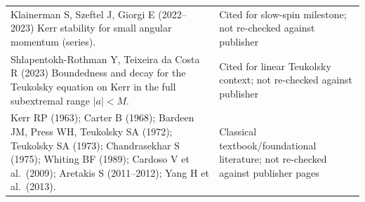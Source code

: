 \documentclass[11pt, a4paper]{article}
\theoremstyle{remark}
\begin{document}
\begin{table}[h]
\begin{tabular}{@{}p{10.4cm}p{4.6cm}@{}}
\addlinespace[3pt]
Klainerman S, Szeftel J, Giorgi E (2022--2023) Kerr stability for small angular momentum (series). & Cited for slow-spin milestone; not re-checked against publisher \\
\addlinespace[3pt]
Shlapentokh-Rothman Y, Teixeira da Costa R (2023) Boundedness and decay for the Teukolsky equation on Kerr in the full subextremal range $|a| < M$. & Cited for linear Teukolsky context; not re-checked against publisher \\
\addlinespace[3pt]
Kerr RP (1963); Carter B (1968); Bardeen JM, Press WH, Teukolsky SA (1972); Teukolsky SA (1973); Chandrasekhar S (1975); Whiting BF (1989); Cardoso V et al.\ (2009); Aretakis S (2011--2012); Yang H et al.\ (2013). & Classical textbook/foundational literature; not re-checked against publisher pages \\
\bottomrule
\end{tabular}
\end{table}
\end{document}
